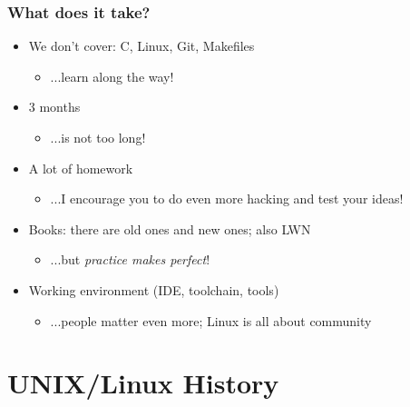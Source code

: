 \begin{frame}
  \frametitle{What does it take?}
  \begin{itemize}

    \item We don't cover: C, Linux, Git, Makefiles
    \begin{itemize}
      \item ...learn along the way!
    \end{itemize}

    \pause
    \item 3 months
    \begin{itemize}
      \item ...is not too long!
    \end{itemize}

    \pause
    \item A lot of homework
    \begin{itemize}
      \item ...I encourage you to do even more hacking and test your ideas!
    \end{itemize}

    \pause
    \item Books: there are old ones and new ones; also LWN
    \begin{itemize}
      \item ...but \textit{practice makes perfect}!
    \end{itemize}

    \pause
    \item Working environment (IDE, toolchain, tools)
    \begin{itemize}
      \item ...people matter even more; Linux is all about community
    \end{itemize}
  \end{itemize}
\end{frame}

\section{UNIX/Linux History}

